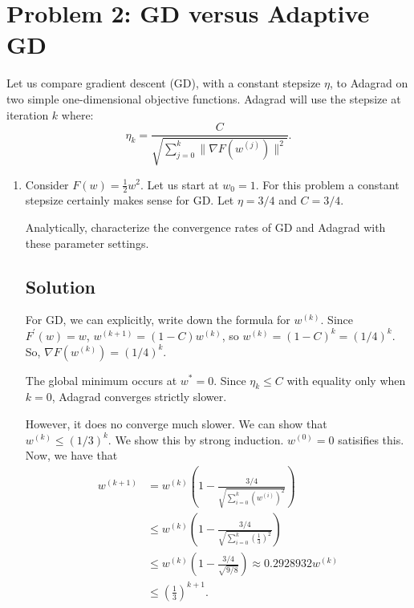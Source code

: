 \documentclass[letterpaper,11pt]{article}
\begin{document}
\section*{Problem 2: GD versus Adaptive GD}

Let us compare gradient descent (GD), with a constant stepsize $\eta$, to
Adagrad on two simple one-dimensional objective functions. Adagrad will use the
stepsize at iteration $k$ where:
\begin{equation}
  \eta_k = \frac{C}{\sqrt{\sum_{j = 0}^k \lVert \nabla F \left(
        w^{(j)}
      \right)\rVert^2}}.
\end{equation}

\begin{enumerate}
\item Consider $F(w) = \frac{1}{2}w^2$. Let us start at $w_0 = 1$. For this
  problem a constant stepsize certainly makes sense for GD. Let $\eta = 3/4$ and
  $C = 3/4$.


  Analytically, characterize the convergence rates of GD and Adagrad
  with these parameter settings.

  \subsection*{Solution}

  For GD, we can explicitly, write down the formula for $w^{(k)}$. Since
  $F^\prime(w) = w$, $w^{(k+1)} = (1 - C)w^{(k)}$, so
  $w^{(k)} = \left(1-C\right)^k = \left(1/4\right)^k$. So,
  $\nabla F\left(w^{(k)}\right) = \left(1/4\right)^k$.

  The global minimum occurs at $w^* = 0$. Since $\eta_k \leq C$ with equality
  only when $k = 0$, Adagrad converges strictly slower.

  However, it does no converge much slower. We can show that
  $w^{(k)} \leq \left(1/3\right)^k$. We show this by strong
  induction. $w^{(0)} = 0$ satisifies this. Now, we have that
  \begin{align*}
    w^{(k+1)}
    &= w^{(k)}\left(1 - \frac{3/4}{\sqrt{\sum_{i = 0}^k \left(w^{(i)}\right)^2}}\right) \\
    &\leq w^{(k)}\left(1 - \frac{3/4}{\sqrt{\sum_{i = 0}^k \left(\frac{1}{3}\right)^2}}\right) \\
    &\leq w^{(k)}\left(1 - \frac{3/4}{\sqrt{9/8}}\right) \approx 0.2928932 w^{(k)} \\
    &\leq \left(\frac{1}{3}\right)^{k + 1}.      
  \end{align*}


\end{enumerate}
\end{document}
